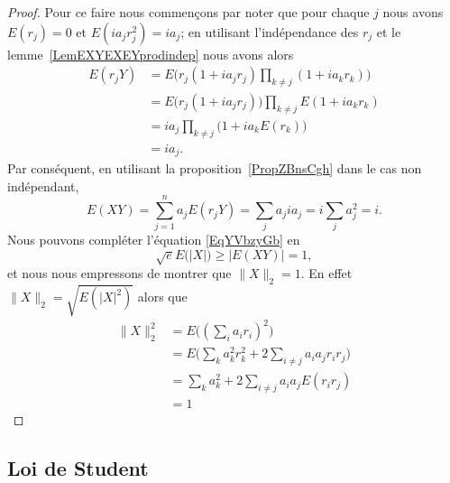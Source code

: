 \begin{proof}
	Pour ce faire nous commençons par noter que pour chaque \( j\) nous avons \( E(r_j)=0\) et \( E(ia_jr_j^2)=ia_j\); en utilisant l'indépendance des \( r_j\) et le lemme~\ref{LemEXYEXEYprodindep} nous avons alors
	\begin{subequations}
		\begin{align}
			E(r_jY) & =E\Big( r_j(1+ia_jr_j)\prod_{k\neq j}(1+ia_kr_k) \Big)  \\
			        & =E\big( r_j(1+ia_jr_j) \big)\prod_{k\neq j}E(1+ia_kr_k) \\
			        & =ia_j\prod_{k\neq j}\big( 1+ia_kE(r_k) \big)            \\
			        & =ia_j.
		\end{align}
	\end{subequations}
	Par conséquent, en utilisant la proposition~\ref{PropZBnsCgh} dans le cas non indépendant,
	\begin{equation}
		E(XY)=\sum_{j=1}^na_jE(r_jY)=\sum_ja_jia_j=i\sum_ja_j^2=i.
	\end{equation}
	Nous pouvons compléter l'équation \eqref{EqYVbzyGb} en
	\begin{equation}
		\sqrt{e}E\big( | X | \big)\geq \big| E(XY) \big|=1,
	\end{equation}
	et nous nous empressons de montrer que \( \| X \|_2=1\). En effet \( \| X \|_2=\sqrt{E(| X |^2)}\) alors que
	\begin{subequations}
		\begin{align}
			\| X \|_2^2 & =E\big( (\sum_ia_ir_i)^2 \big)                             \\
			            & =E\Big( \sum_ka_k^2r_k^2+2\sum_{i\neq j}a_ia_jr_ir_j \Big) \\
			            & =\sum_ka_k^2+2\sum_{i\neq j}a_ia_jE(r_ir_j)                \\
			            & =1
		\end{align}
	\end{subequations}
\end{proof}

\subsection{Loi de Student}

